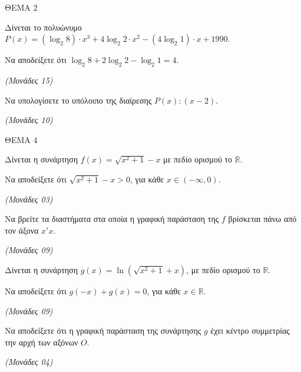 \documentclass[11pt,a4paper,twoside]{book}
\newcommand{\monades}[1]{\hfill \textit{(Μονάδες #1)}}
\begin{document}
\vspace{4mm}

ΘΕΜΑ 2

Δίνεται το πολυώνυμο $P(x) = (\log_2 8) \cdot x^3 + 4\log_2 2 \cdot x^2 - (4\log_2 1) \cdot x + 1990$.

\begin{alist}
\item Να αποδείξετε ότι $\log_2 8 + 2\log_2 2 - \log_2 1 = 4$.

\monades{15}

\item Να υπολογίσετε το υπόλοιπο της διαίρεσης $P(x) : (x - 2)$.

\monades{10}
\end{alist}

\vspace{4mm}

ΘΕΜΑ 4

\begin{alist}
\item Δίνεται η συνάρτηση $f(x) = \sqrt{x^2 + 1} - x$ με πεδίο ορισμού το $\mathbb{R}$.

\end{alist}
\begin{alist}
\item
  Να αποδείξετε ότι $\sqrt{x^2 + 1} - x > 0$, για κάθε $x \in (-\infty, 0)$.

\monades{03}


\end{alist}
\begin{alist}
\item
  Να βρείτε τα διαστήματα στα οποία η γραφική παράσταση της $f$ βρίσκεται πάνω από τον άξονα $x'x$.

\monades{09}

\item Δίνεται η συνάρτηση $g(x) = \ln(\sqrt{x^2 + 1} + x)$, με πεδίο ορισμού το $\mathbb{R}$.

\end{alist}
\begin{alist}
\item
  Να αποδείξετε ότι $g(-x) + g(x) = 0$, για κάθε $x \in \mathbb{R}$.

\monades{09}


\end{alist}
\begin{alist}
\item
  Να αποδείξετε ότι η γραφική παράσταση της συνάρτησης $g$ έχει κέντρο συμμετρίας την αρχή των αξόνων $O$.

\monades{04}
\end{alist}
\end{document}
